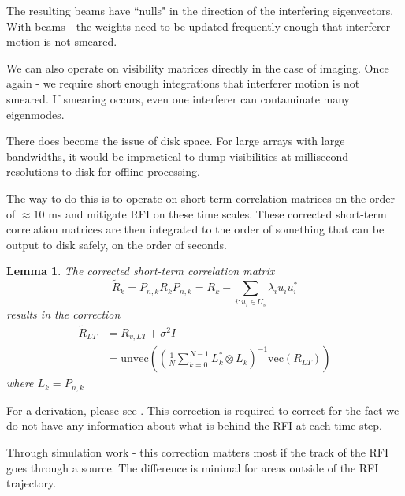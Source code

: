 \documentclass{pas}
\newtheorem{lemma}{Lemma}
\begin{document}
The resulting beams have ``nulls" in the direction of the interfering eigenvectors. 
With beams - the weights need to be updated frequently enough that interferer motion
is not smeared. 

We can also operate on visibility matrices directly in the case of imaging. 
Once again - we require short enough integrations that interferer motion is not 
smeared. 
If smearing occurs, even one interferer can contaminate many eigenmodes.

There does become the issue of disk space. For large arrays with large bandwidths, 
it would be impractical to dump visibilities at millisecond resolutions to disk for 
offline processing. 

The way to do this is to operate on short-term correlation matrices on the order of 
$\approx 10$ ms and mitigate RFI on these time scales. 
These corrected short-term correlation matrices are then integrated to the order of 
something that can be output to disk safely, on the order of seconds.

\begin{lemma}
  The corrected short-term correlation matrix 
  \begin{equation}
    \tilde{R}_{k} = P_{n,k}R_{k}P_{n,k} = R_{k} - \sum_{i: u_{i} \in U_{s}}\lambda_{i}u_{i}u_{i}^{*}
  \end{equation}
  results in the correction 
  \begin{align}
    \tilde{R}_{LT} &= R_{v, LT} + \sigma^{2} I\\ 
                   &=  \text{unvec}\left(\left(\frac{1}{N} \sum_{k=0}^{N-1} L_{k}^{*} \otimes L_{k} \right)^{-1}\text{vec}(R_{LT})\right)
  \end{align}
  where $L_{k} = P_{n,k}$ 
\end{lemma}

For a derivation, please see \cite{leshem_multichannel_2000}.
This correction is required to correct for the fact we do not have any information
about what is behind the RFI at each time step.

Through simulation work - this correction matters most if the track of the RFI 
goes through a source. 
The difference is minimal for areas outside of the RFI trajectory.
\end{document}
